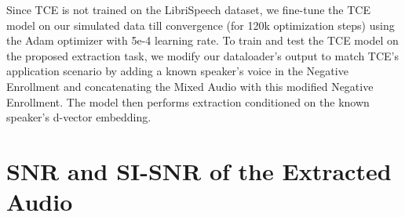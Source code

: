 Since TCE is not trained on the LibriSpeech dataset, we fine-tune the TCE model on our simulated data till convergence (for 120k optimization steps) using the Adam optimizer with 5e-4 learning rate. To train and test the TCE model on the proposed extraction task, we modify our dataloader's output to match TCE's application scenario by adding a known speaker's voice in the Negative Enrollment and concatenating the Mixed Audio with this modified Negative Enrollment. The model then performs extraction conditioned on the known speaker's d-vector embedding.


\section{SNR and SI-SNR of the Extracted Audio}

\begin{table}[t]
\caption{Comparison between our method and the baselines' extraction performance. In addition to the result reported in the main paper, we include the SNR and SI-SNR metrics of the extracted audio in this table.}
\label{tab:main-full-result}
\vskip 0.15in
\begin{center}
\end{center}
\end{table}
